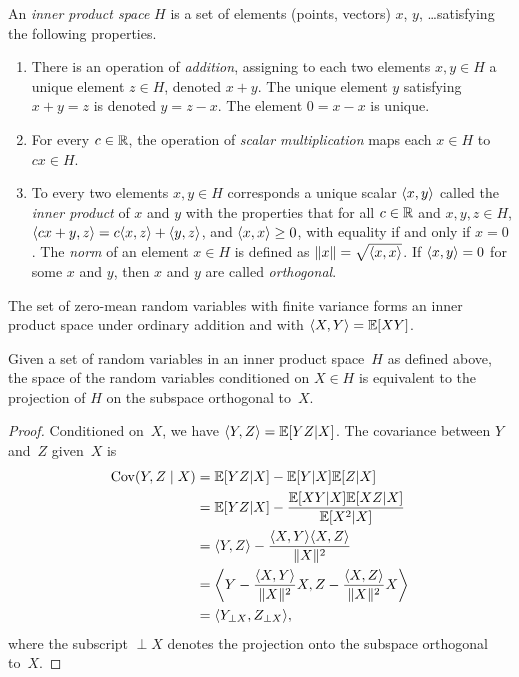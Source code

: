 \begin{definition}
  An \emph{inner product space} $H$ is a set of elements (points, vectors) $x$,
  $y$, \dots satisfying the following properties.
  \begin{enumerate}
    \item There is an operation of \emph{addition}, assigning to each two
      elements $x, y \in H$ a unique element $z \in H$, denoted $x + y$.
      The unique element $y$ satisfying $x + y = z$ is denoted $y = z - x$. The
      element $0 = x-x$ is unique. 
    \item For every $c \in \R$, the operation of \emph{scalar multiplication}
      maps each $x \in H$ to $cx \in H$. 
    \item To every two elements $x,y \in H$ corresponds a unique scalar $\sp x
      y$ called the \emph{inner product} of $x$ and $y$ with the properties that
      for all $c \in \R$ and $x,y, z\in H$, $\sp{cx+y}{z} = c\sp xz + \sp yz$,
      and $\sp xx \ge 0$, with equality if and only if $x = 0$. The
      \emph{norm} of an element $x \in H$ is defined as $\|x\| = \sqrt{\sp xx}$.
      If $\sp xy = 0$ for some $x$ and $y$, then $x$ and $y$ are called
      \emph{orthogonal}.
  \end{enumerate}
\end{definition}

\begin{lemma}
  \label{lem:rvinprodsp}
  The set of zero-mean random variables with finite variance forms an inner
  product space under ordinary addition and with $\sp XY = \E[X Y]$. 
\end{lemma}

\begin{lemma}
  \label{lem:inprodspcond}
  Given a set of random variables in an inner product space~$H$ as defined
  above, the space of the random variables conditioned on $X \in H$ is
  equivalent to the projection of $H$ on the subspace orthogonal to~$X$.
\end{lemma}
\begin{proof}
  Conditioned on~$X$, we have $\sp YZ = \E[YZ|X]$. The covariance between $Y$
  and~$Z$ given~$X$ is
  \begin{align*}
    \Cov(Y, Z \mid X) &= \E[YZ|X] - \E[Y|X]\E[Z|X] \\
    &= \E[YZ|X] - \frac{\E[XY|X]\E[XZ|X]}{\E[X^2|X]} \\
    &= \sp YZ - \frac{\sp XY \sp XZ}{\|X\|^2} \\
    &= \left\bra Y - \frac{\sp XY}{\|X\|^2} X, Z - \frac{\sp XZ}{\|X\|^2} X
    \right\ket \\
    &= \sp{Y_{\perp X}}{Z_{\perp X}},
  \end{align*}
  where the subscript $\perp X$ denotes the projection onto the subspace
  orthogonal to~$X$.
\end{proof}


